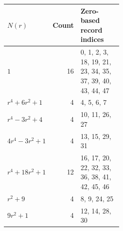 \begin{center}\small
\begin{tabular}{lrp{0.47\linewidth}}
\toprule
$N(r)$ & Count & Zero-based record indices\\
\midrule
$1$ & 16 & 0, 1, 2, 3, 18, 19, 21, 23, 34, 35, 37, 39, 40, 43, 44, 47\\
$r^{4} + 6 r^{2} + 1$ & 4 & 4, 5, 6, 7\\
$r^{4} - 3 r^{2} + 4$ & 4 & 10, 11, 26, 27\\
$4 r^{4} - 3 r^{2} + 1$ & 4 & 13, 15, 29, 31\\
$r^{4} + 18 r^{2} + 1$ & 12 & 16, 17, 20, 22, 32, 33, 36, 38, 41, 42, 45, 46\\
$r^{2} + 9$ & 4 & 8, 9, 24, 25\\
$9 r^{2} + 1$ & 4 & 12, 14, 28, 30\\
\bottomrule
\end{tabular}
\end{center}

